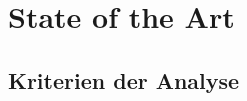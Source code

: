 \documentclass[../Bachelorarbeit.tex]{subfiles}
\begin{document}
\chapter{State of the Art}
\label{chap:state_of_the_art}




\section{Kriterien der Analyse}
\label{sec:kriterien_der_analyse}
\end{document}
